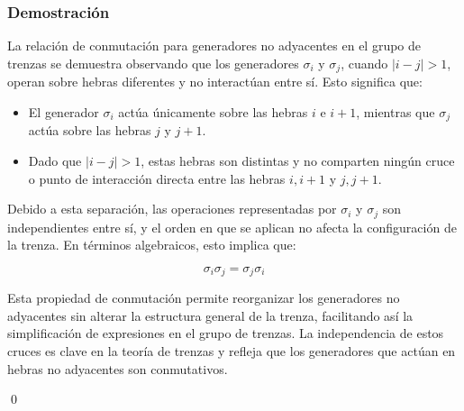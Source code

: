 \subsubsection*{Demostración}

La relación de conmutación para generadores no adyacentes en el grupo de trenzas se demuestra observando que los generadores \(\sigma_i\) y \(\sigma_j\), cuando \(|i - j| > 1\), operan sobre hebras diferentes y no interactúan entre sí. Esto significa que:

\begin{itemize}
    \item El generador \(\sigma_i\) actúa únicamente sobre las hebras \(i\) e \(i+1\), mientras que \(\sigma_j\) actúa sobre las hebras \(j\) y \(j+1\).
    \item Dado que \(|i - j| > 1\), estas hebras son distintas y no comparten ningún cruce o punto de interacción directa entre las hebras \(i, i+1\) y \(j, j+1\).
\end{itemize}

Debido a esta separación, las operaciones representadas por \(\sigma_i\) y \(\sigma_j\) son independientes entre sí, y el orden en que se aplican no afecta la configuración de la trenza. En términos algebraicos, esto implica que:

\[
\sigma_i \sigma_j = \sigma_j \sigma_i
\]

Esta propiedad de conmutación permite reorganizar los generadores no adyacentes sin alterar la estructura general de la trenza, facilitando así la simplificación de expresiones en el grupo de trenzas. La independencia de estos cruces es clave en la teoría de trenzas y refleja que los generadores que actúan en hebras no adyacentes son conmutativos.

\hfill \qed
